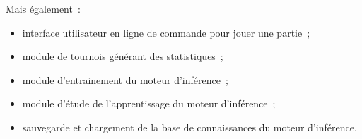 Mais également~:

\begin{itemize}

    \item interface utilisateur en ligne de commande pour jouer une partie~;
    \item module de tournois générant des statistiques~;
    \item module d'entrainement du moteur d'inférence~;
    \item module d'étude de l'apprentissage du moteur d'inférence~;
    \item sauvegarde et chargement de la base de connaissances du moteur d'inférence.

\end{itemize}
